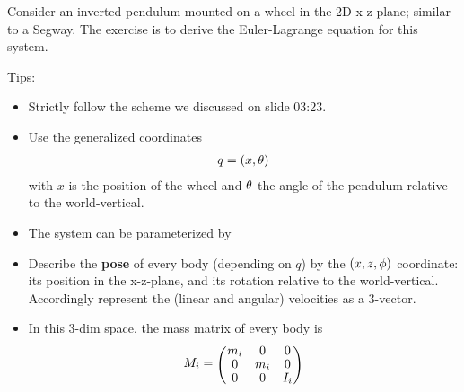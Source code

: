 

\renewcommand{\course}{Robotics}
\renewcommand{\coursepicture}{roboticsLecture}
\renewcommand{\coursedate}{Winter 2014}
\renewcommand{\exnum}{6}

\exercises


\exercisestitle




Consider an inverted pendulum mounted on a wheel in the 2D x-z-plane;
similar to a Segway. The exercise is to derive the Euler-Lagrange
equation for this system.

Tips:
\begin{itemize}
\item Strictly follow the scheme we discussed on slide 03:23.
\item Use the generalized coordinates
\begin{align}
q=(x,\theta)
\end{align}
with $x$ is the position of the wheel and $\theta$ the angle of the
pendulum relative to the world-vertical.
\item The system can be parameterized by
\item Describe the \textbf{pose} of every body (depending on $q$) by
the $(x,z,\phi)$ coordinate: its position in the x-z-plane, and its
rotation relative to the world-vertical. Accordingly represent the
(linear and angular) velocities as a 3-vector.
\item In this 3-dim space, the mass matrix of every body is
\begin{align}
M_i = \mat{ccc}{m_i & 0 & 0 \\ 0 & m_i & 0 \\ 0 & 0 & I_i}
\end{align}
\end{itemize}



